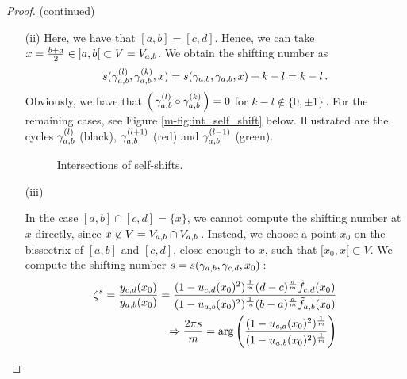 \documentclass[main.tex]{subfiles}
\begin{document}
   \begin{proof}(continued)\let\qed\relax
   \begin{itemize}
    \item[(ii)] Here, we have that $[a,b] = [c,d]$. Hence, we can take $x = \frac{b+a}{2} \in \; ]a,b[ \; \subset V = V_{a,b}$. We obtain the shifting number as
    \begin{align*}
      s(\gamma_{a,b}^{(l)},\gamma_{a,b}^{(k)},x) = s(\gamma_{a,b},\gamma_{a,b},x) + k - l = k - l\,.
    \end{align*}
    Obviously, we have that $\left(\,\gamma_{a,b}^{(l)} \circ \gamma_{a,b}^{(k)}\,\right) = 0$ for $k - l \not\in \{ 0, \pm 1\}$\,. For the remaining cases, see Figure \ref{m-fig:int_self_shift} below.
    Illustrated are the cycles $\gamma_{a,b}^{(l)}$ (black),
      $\gamma_{a,b}^{(l+1)}$ (red) and $\gamma_{a,b}^{(l-1)}$ (green). 
    \begin{figure}[H]
      \begin{center}
	  
      \end{center}
    \caption{Intersections of self-shifts.}
    \label{fig:int_self_shift}
\end{figure}
   \item[(iii)]
    
  In the case $[a,b] \cap [c,d] = \{ x \}$, we cannot compute the shifting number at $x$ directly, since $x \not\in V = V_{a,b} \cap V_{a,b}$\,. Instead, we choose a point $x_0$ on the bissectrix of 
  $[a,b]$ and $[c,d]$, close enough to $x$, such that $[x_0,x[ \subset V$. We compute the shifting number $s = s(\gamma_{a,b},\gamma_{c,d},x_0)$\,:
  \begin{align}
   \zeta^s = \frac{y_{c,d}(x_0)}{y_{a,b}(x_0)} = \frac{(1- u_{c,d}(x_0)^2)^{\frac{1}{m}} (d-c)^{\frac{d}{m}}\tilde{f}_{c,d}(x_0) }{(1-u_{a,b}(x_0)^2)^{\frac{1}{m}} (b-a)^{\frac{d}{m}}\tilde{f}_{a,b}(x_0)} \\
   \Rightarrow \frac{2\pi s}{m} = \arg \left( \frac{(1- u_{c,d}(x_0)^2)^{\frac{1}{m}}}{(1-u_{a,b}(x_0)^2)^{\frac{1}{m}}} \right)
  \end{align}

  
  
	  
	
	\end{itemize}
  \end{proof}
	
	

	
\end{document}
